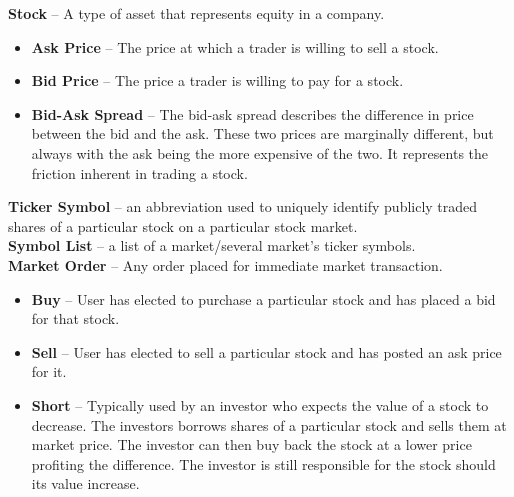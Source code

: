 {\textbf{Stock} -- A type of asset that represents equity in a company.
\begin{itemize}
    \item \textbf{Ask Price} -- The price at which a trader is willing
                                to sell a stock.\\
    \item \textbf{Bid Price} -- The price a trader is willing to pay for
                                a stock.\\
    \item \textbf{Bid-Ask Spread} -- The bid-ask spread describes the
                                     difference in price between the bid
                                     and the ask. These two prices are
                                     marginally different, but always with
                                     the ask being the more expensive of the
                                     two. It represents the friction inherent
                                     in trading a stock.\cite{inv:bidask}\\
\end{itemize}

\textbf{Ticker Symbol} -- an abbreviation used to uniquely identify publicly
traded shares of a particular stock on a particular stock market.\\

\textbf{Symbol List} -- a list of a market/several market's ticker symbols.\\


\textbf{Market Order} -- Any order placed for immediate market transaction.\\

\begin{itemize}
    \item \textbf{Buy} -- User has elected to purchase a particular stock and has placed
    a bid for that stock.\\

    \item \textbf{Sell} -- User has elected to sell a particular stock and has posted an
    ask price for it.\\

    \item \textbf{Short} -- Typically used by an investor who expects the value of
    a stock to decrease. The investors borrows shares of a particular stock and sells
    them at market price. The investor can then buy back the stock at a lower price
    profiting the difference. The investor is still responsible for the stock should
    its value increase.\cite{inv:short}\\
    \end{itemize}

}
